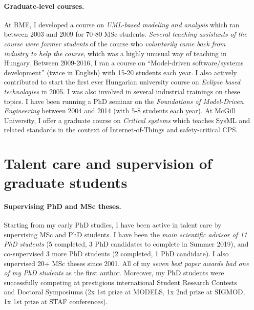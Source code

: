 \documentclass[a4paper,11pt]{article}
\begin{document}
\paragraph{Graduate-level courses.}
At BME, I developed a course on \emph{UML-based modeling and analysis} which ran between 2003 and 2009 for 70-80 MSc students. \emph{Several teaching assistants of the course were former students} of the course who \emph{voluntarily came back from industry to help the course}, which was a highly unusual way of teaching in Hungary. Between 2009-2016, I ran a course on “Model-driven software/systems development” (twice in English) with 15-20 students each year. I also actively contributed to start the first ever Hungarian university course on \emph{Eclipse based technologies} in 2005. I was also involved in several industrial trainings on these topics. I have been running a PhD seminar on the \emph{Foundations of Model-Driven Engineering} between 2004 and 2014 (with 5-8 students each year). At McGill University, I offer a graduate course on 
\emph{Critical systems} 
which teaches SysML and related standards in the context of Internet-of-Things and safety-critical CPS.


\section{Talent care and supervision of graduate students}
\paragraph{Supervising PhD and MSc theses.}
Starting from my early PhD studies, I have been active in talent care by supervising MSc and PhD students. I have been the \emph{main scientific advisor of 11 PhD students} (5 completed, 3 PhD candidates to complete in Summer 2019), and co-supervised 3 more PhD students (2 completed, 1 PhD candidate). I also supervised 20+ MSc theses since 2001. All of my \emph{seven best paper awards had one of my PhD students} as the first author. Moreover, my PhD students were successfully competing at prestigious international Student Research Contests and Doctoral Symposiums (2x 1st prize at MODELS, 1x 2nd prize at SIGMOD, 1x 1st prize at STAF conferences).
\end{document}
